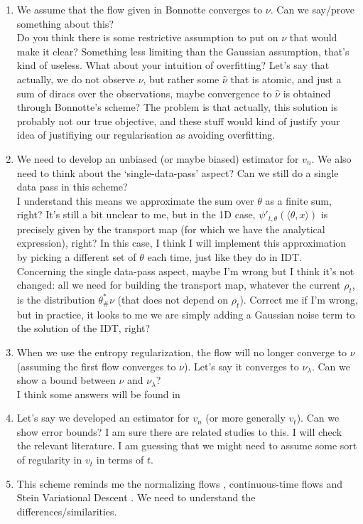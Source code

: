 \documentclass{article}
\begin{document}
\begin{enumerate}
\item We assume that the flow given in Bonnotte converges to $\nu$. Can we say/prove something about this?
\\Do you think there is some restrictive assumption to put on $\nu$ that would make it clear? Something less limiting than the Gaussian assumption, that's kind of useless. What about your intuition of overfitting? Let's say that actually, we do not observe $\nu$, but rather some $\hat{\nu}$ that is atomic, and just a sum of diracs over the observations, maybe convergence to $\hat{\nu}$ is obtained through Bonnotte's scheme? The problem is that actually, this solution is probably not our true objective, and these stuff would kind of justify your idea of justifiying our regularisation as avoiding overfitting.
\item We need to develop an unbiased (or maybe biased) estimator for $v_n$. We also need to think about the `single-data-pass' aspect? Can we still do a single data pass in this scheme?
\\ I understand this means we approximate the sum over $\theta$ as a finite sum, right? It's still a bit unclear to me, but in the 1D case, $\psi'_{t,\theta}(\langle \theta, x \rangle)$ is precisely given by the transport map (for which we have the analytical expression), right? In this case, I think I will implement this approximation by picking a different set of $\theta$ each time, just like they do in IDT.
\\Concerning the single data-pass aspect, maybe I'm wrong but I think it's not changed: all we need for building the transport map, whatever the current $\rho_t$, is the distribution $\theta^*_{\#}\nu$ (that does not depend on $\rho_t$). Correct me if I'm wrong, but in practice, it looks to me we are simply adding a Gaussian noise term to the solution of the IDT, right?
\item When we use the entropy regularization, the flow will no longer converge to $\nu$ (assuming the first flow converges to $\nu$). Let's say it converges to $\nu_\lambda$. Can we show a bound between $\nu$ and $\nu_\lambda$?
\\I think some answers will be found in~\cite{cuturi2013sinkhorn}
\item Let's say we developed an estimator for $v_n$ (or more generally $v_t$). Can we show error bounds? I am sure there are related studies to this. I will check the relevant literature. I am guessing that we might need to assume some sort of regularity in $v_t$ in terms of $t$.
\item This scheme reminds me the normalizing flows \cite{rezende2015variational}, continuous-time flows \cite{chen2018cont} and Stein Variational Descent \cite{liu2016stein,liu2017stein}. We need to understand the differences/similarities.
\end{enumerate}




\end{document}
